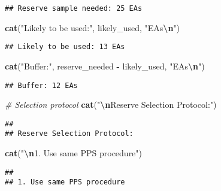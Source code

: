 \documentclass[
]{article}
\newenvironment{Shaded}{\begin{snugshade}}{\end{snugshade}}
\newcommand{\CommentTok}[1]{\textcolor[rgb]{0.56,0.35,0.01}{\textit{#1}}}
\newcommand{\FunctionTok}[1]{\textcolor[rgb]{0.13,0.29,0.53}{\textbf{#1}}}
\newcommand{\NormalTok}[1]{#1}
\newcommand{\SpecialCharTok}[1]{\textcolor[rgb]{0.81,0.36,0.00}{\textbf{#1}}}
\newcommand{\StringTok}[1]{\textcolor[rgb]{0.31,0.60,0.02}{#1}}
\begin{document}
\begin{verbatim}
## Reserve sample needed: 25 EAs
\end{verbatim}

\begin{Shaded}
\begin{Highlighting}[]
\FunctionTok{cat}\NormalTok{(}\StringTok{"Likely to be used:"}\NormalTok{, likely\_used, }\StringTok{"EAs}\SpecialCharTok{\textbackslash{}n}\StringTok{"}\NormalTok{)}
\end{Highlighting}
\end{Shaded}

\begin{verbatim}
## Likely to be used: 13 EAs
\end{verbatim}

\begin{Shaded}
\begin{Highlighting}[]
\FunctionTok{cat}\NormalTok{(}\StringTok{"Buffer:"}\NormalTok{, reserve\_needed }\SpecialCharTok{{-}}\NormalTok{ likely\_used, }\StringTok{"EAs}\SpecialCharTok{\textbackslash{}n}\StringTok{"}\NormalTok{)}
\end{Highlighting}
\end{Shaded}

\begin{verbatim}
## Buffer: 12 EAs
\end{verbatim}

\begin{Shaded}
\begin{Highlighting}[]
\CommentTok{\# Selection protocol}
\FunctionTok{cat}\NormalTok{(}\StringTok{"}\SpecialCharTok{\textbackslash{}n}\StringTok{Reserve Selection Protocol:"}\NormalTok{)}
\end{Highlighting}
\end{Shaded}

\begin{verbatim}
## 
## Reserve Selection Protocol:
\end{verbatim}

\begin{Shaded}
\begin{Highlighting}[]
\FunctionTok{cat}\NormalTok{(}\StringTok{"}\SpecialCharTok{\textbackslash{}n}\StringTok{1. Use same PPS procedure"}\NormalTok{)}
\end{Highlighting}
\end{Shaded}

\begin{verbatim}
## 
## 1. Use same PPS procedure
\end{verbatim}
\end{document}
